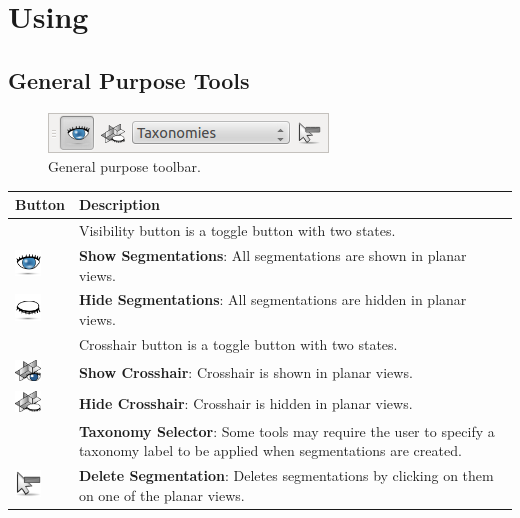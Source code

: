 \section{Using \espina}

\subsection{General Purpose Tools}
\begin{figure}[H]
\centering
\includegraphics[scale=0.75]{fig/MainToolbar}
\caption{General purpose toolbar.}
\end{figure}

\begin{tabular}{| m{1.3cm} | m{12cm} |}
\hline
\textbf{Button} & \textbf{Description}\\
\hline
& Visibility button is a toggle button with two states.\\ 
\includegraphics[width=0.7cm]{../../frontend/rsc/show_all} &
\textbf{Show Segmentations}: All segmentations are shown in planar views.\\
\includegraphics[width=0.7cm]{../../frontend/rsc/hide_all} &
\textbf{Hide Segmentations}: All segmentations are hidden in planar views.\\
\hline
& Crosshair button is a toggle button with two states.\\ 
\includegraphics[width=0.7cm]{../../frontend/rsc/show_planes} &
\textbf{Show Crosshair}: Crosshair is shown in planar views.\\
\includegraphics[width=0.7cm]{../../frontend/rsc/hide_planes} &
\textbf{Hide Crosshair}: Crosshair is hidden in planar views.\\
\hline
 & %
\textbf{Taxonomy Selector}: Some tools may require the user to specify a
taxonomy label to be applied when segmentations are created.\\
\hline
\includegraphics[width=0.7cm]{../../frontend/rsc/removeSeg} &
\textbf{Delete Segmentation}: Deletes segmentations by clicking on them on one of the planar views.\\
\hline
\end{tabular}

